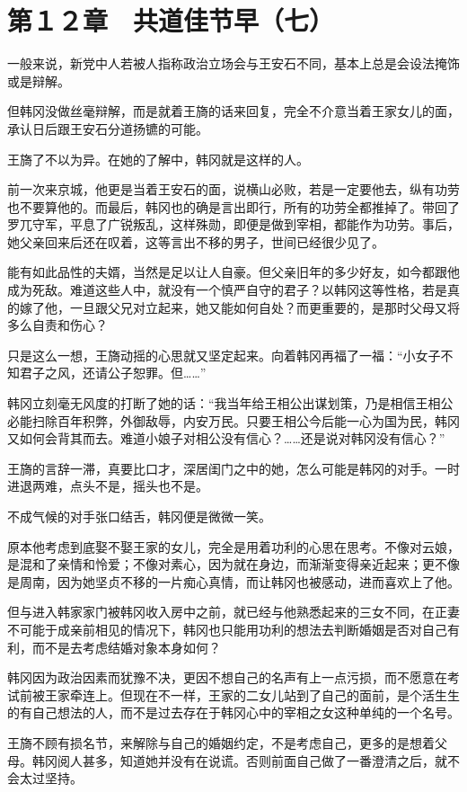 \section{第１２章　共道佳节早（七）}

一般来说，新党中人若被人指称政治立场会与王安石不同，基本上总是会设法掩饰或是辩解。

但韩冈没做丝毫辩解，而是就着王旖的话来回复，完全不介意当着王家女儿的面，承认日后跟王安石分道扬镳的可能。

王旖了不以为异。在她的了解中，韩冈就是这样的人。

前一次来京城，他更是当着王安石的面，说横山必败，若是一定要他去，纵有功劳也不要算他的。而最后，韩冈也的确是言出即行，所有的功劳全都推掉了。带回了罗兀守军，平息了广锐叛乱，这样殊勋，即便是做到宰相，都能作为功劳。事后，她父亲回来后还在叹着，这等言出不移的男子，世间已经很少见了。

能有如此品性的夫婿，当然是足以让人自豪。但父亲旧年的多少好友，如今都跟他成为死敌。难道这些人中，就没有一个慎严自守的君子？以韩冈这等性格，若是真的嫁了他，一旦跟父兄对立起来，她又能如何自处？而更重要的，是那时父母又将多么自责和伤心？

只是这么一想，王旖动摇的心思就又坚定起来。向着韩冈再福了一福：“小女子不知君子之风，还请公子恕罪。但……”

韩冈立刻毫无风度的打断了她的话：“我当年给王相公出谋划策，乃是相信王相公必能扫除百年积弊，外御敌辱，内安万民。只要王相公今后能一心为国为民，韩冈又如何会背其而去。难道小娘子对相公没有信心？……还是说对韩冈没有信心？”

王旖的言辞一滞，真要比口才，深居闺门之中的她，怎么可能是韩冈的对手。一时进退两难，点头不是，摇头也不是。

不成气候的对手张口结舌，韩冈便是微微一笑。

原本他考虑到底娶不娶王家的女儿，完全是用着功利的心思在思考。不像对云娘，是混和了亲情和怜爱；不像对素心，因为就在身边，而渐渐变得亲近起来；更不像是周南，因为她坚贞不移的一片痴心真情，而让韩冈也被感动，进而喜欢上了他。

但与进入韩家家门被韩冈收入房中之前，就已经与他熟悉起来的三女不同，在正妻不可能于成亲前相见的情况下，韩冈也只能用功利的想法去判断婚姻是否对自己有利，而不是去考虑结婚对象本身如何？

韩冈因为政治因素而犹豫不决，更因不想自己的名声有上一点污损，而不愿意在考试前被王家牵连上。但现在不一样，王家的二女儿站到了自己的面前，是个活生生的有自己想法的人，而不是过去存在于韩冈心中的宰相之女这种单纯的一个名号。

王旖不顾有损名节，来解除与自己的婚姻约定，不是考虑自己，更多的是想着父母。韩冈阅人甚多，知道她并没有在说谎。否则前面自己做了一番澄清之后，就不会太过坚持。


